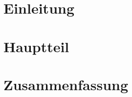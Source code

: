 \documentclass{tubsphilprotocol}
\author{Max Mustermann}
\date{1.1.2020}
\begin{document}
\maketitle
\section{Einleitung}
\lipsum[1]
\section{Hauptteil}
\lipsum[2-3]
\section{Zusammenfassung}
\lipsum[4]
\end{document}
